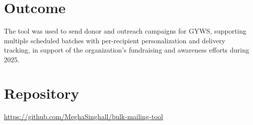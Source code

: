 \documentclass[11pt]{article}
\begin{document}
\section*{Outcome}
The tool was used to send donor and outreach campaigns for GYWS, supporting multiple scheduled batches
with per-recipient personalization and delivery tracking, in support of the organization's fundraising
and awareness efforts during 2025.

\section*{Repository}
\url{https://github.com/MeghaSinghall/bulk-mailing-tool}
\end{document}
